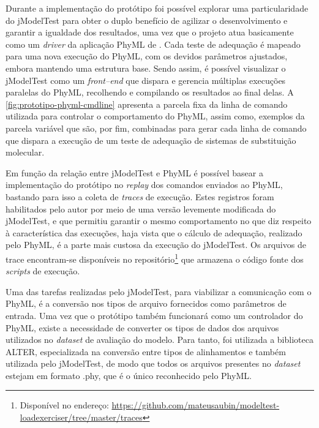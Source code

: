 \documentclass[english,brazilian]{UNISINOSmonografia} %
\begin{document}
Durante a implementação do protótipo foi possível explorar uma particularidade do jModelTest para obter o duplo benefício de agilizar o desenvolvimento e garantir a igualdade dos resultados, uma vez que o projeto atua basicamente como um \textit{driver} da aplicação PhyML de .
Cada teste de adequação é mapeado para uma nova execução do PhyML, com os devidos parâmetros ajustados, embora mantendo uma estrutura base.
Sendo assim, é possível visualizar o jModelTest como um \textit{front--end} que dispara e gerencia múltiplas execuções paralelas do PhyML, recolhendo e compilando os resultados ao final delas.
A \autoref{fig:prototipo-phyml-cmdline} apresenta a parcela fixa da linha de comando utilizada para controlar o comportamento do PhyML, assim como, exemplos da parcela variável que são, por fim, combinadas para gerar cada linha de comando que dispara a execução de um teste de adequação de sistemas de substituição molecular.


Em função da relação entre jModelTest e PhyML é possível basear a implementação do protótipo no \textit{replay} dos comandos enviados ao PhyML, bastando para isso a coleta de \textit{traces} de execução.
Estes registros foram habilitados pelo autor por meio de uma versão levemente modificada do jModelTest, e que permitiu garantir o mesmo comportamento no que diz respeito à característica das execuções, haja vista que o cálculo de adequação, realizado pelo PhyML, é a parte mais custosa da execução do jModelTest.
Os arquivos de trace encontram-se disponíveis no repositório\footnote{
	Disponível no endereço: \url{https://github.com/mateusaubin/modeltest-loadexerciser/tree/master/traces}
} que armazena o código fonte dos \textit{scripts} de execução.


Uma das tarefas realizadas pelo jModelTest, para viabilizar a comunicação com o PhyML, é a conversão nos tipos de arquivo fornecidos como parâmetros de entrada.
Uma vez que o protótipo também funcionará como um controlador do PhyML, existe a necessidade de converter os tipos de dados dos arquivos utilizados no \textit{dataset} de avaliação do modelo.
Para tanto, foi utilizada a biblioteca ALTER, especializada na conversão entre tipos de alinhamentos e também utilizada pelo jModelTest, de modo que todos os arquivos presentes no \textit{dataset} estejam em formato .phy, que é o único reconhecido pelo PhyML.
\end{document}
